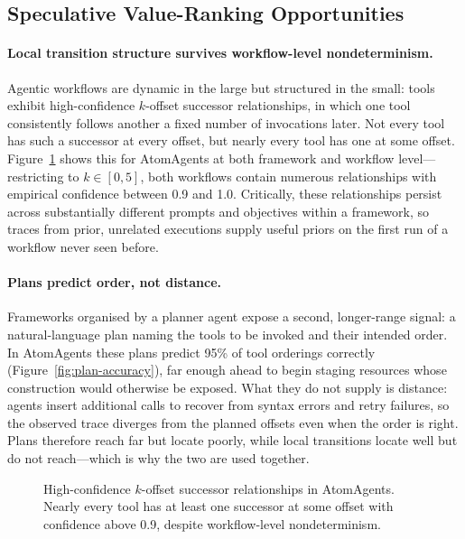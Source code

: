\subsection{Speculative Value-Ranking Opportunities}

\paragraph{Local transition structure survives workflow-level nondeterminism.}
Agentic workflows are dynamic in the large but structured in the small: tools
exhibit high-confidence $k$-offset successor relationships, in which one tool
consistently follows another a fixed number of invocations later. Not every
tool has such a successor at every offset, but nearly every tool has one at
some offset. Figure~\ref{fig:tool-relationships} shows this for AtomAgents at
both framework and workflow level---restricting to $k \in [0,5]$, both
workflows contain numerous relationships with empirical confidence between 0.9
and 1.0. Critically, these relationships persist across substantially
different prompts and objectives within a framework, so traces from prior,
unrelated executions supply useful priors on the first run of a workflow never
seen before.

\paragraph{Plans predict order, not distance.}
Frameworks organised by a planner agent expose a second, longer-range signal:
a natural-language plan naming the tools to be invoked and their intended
order. In AtomAgents these plans predict 95\% of tool orderings correctly
(Figure~\ref{fig:plan-accuracy}), far enough ahead to begin staging resources
whose construction would otherwise be exposed. What they do not supply is
distance: agents insert additional calls to recover from syntax errors and
retry failures, so the observed trace diverges from the planned offsets even
when the order is right. Plans therefore reach far but locate poorly, while
local transitions locate well but do not reach---which is why the two are used
together.

\begin{figure}[t]
\centering
{}
\caption{High-confidence $k$-offset successor relationships in AtomAgents.
Nearly every tool has at least one successor at some offset with confidence
above 0.9, despite workflow-level nondeterminism.}
\label{fig:tool-relationships}
\end{figure}

